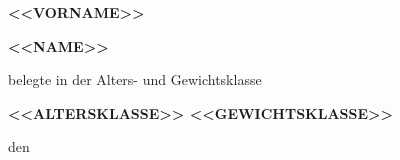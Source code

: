 \begin{center}
    \vspace*{12cm}

    {\huge \textbf{<<VORNAME>>}}
        \vspace{1cm}

    {\huge \textbf{<<NAME>>}}

    \vspace{1cm}

    belegte in der Alters- und Gewichtsklasse
    \vspace{1cm}

    {\huge \textbf{<<ALTERSKLASSE>> <<GEWICHTSKLASSE>>}}

    \vspace{1.5cm}

    den

    \vspace{1.5cm}


    \vspace{1cm}



\end{center}

